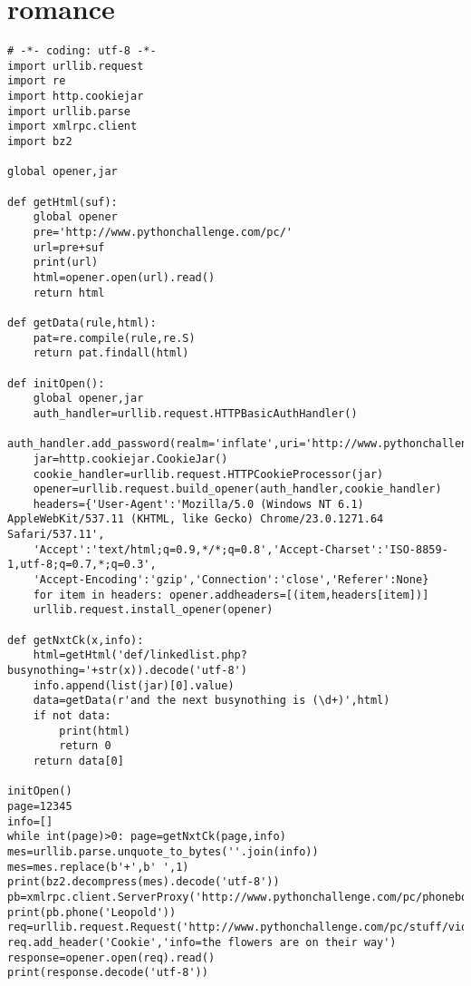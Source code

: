 \documentclass[onecolumn,a4paper,12pt]{article}
\begin{document}
\section{romance}
\begin{lstlisting}
# -*- coding: utf-8 -*-
import urllib.request
import re
import http.cookiejar
import urllib.parse
import xmlrpc.client
import bz2

global opener,jar

def getHtml(suf):
    global opener
    pre='http://www.pythonchallenge.com/pc/'
    url=pre+suf
    print(url)
    html=opener.open(url).read()
    return html

def getData(rule,html):
    pat=re.compile(rule,re.S)
    return pat.findall(html)

def initOpen():
    global opener,jar
    auth_handler=urllib.request.HTTPBasicAuthHandler()
    auth_handler.add_password(realm='inflate',uri='http://www.pythonchallenge.com',user='huge',passwd='file')
    jar=http.cookiejar.CookieJar()
    cookie_handler=urllib.request.HTTPCookieProcessor(jar)
    opener=urllib.request.build_opener(auth_handler,cookie_handler)
    headers={'User-Agent':'Mozilla/5.0 (Windows NT 6.1) AppleWebKit/537.11 (KHTML, like Gecko) Chrome/23.0.1271.64 Safari/537.11',
    'Accept':'text/html;q=0.9,*/*;q=0.8','Accept-Charset':'ISO-8859-1,utf-8;q=0.7,*;q=0.3',
    'Accept-Encoding':'gzip','Connection':'close','Referer':None}
    for item in headers: opener.addheaders=[(item,headers[item])]
    urllib.request.install_opener(opener)

def getNxtCk(x,info):
    html=getHtml('def/linkedlist.php?busynothing='+str(x)).decode('utf-8')
    info.append(list(jar)[0].value)
    data=getData(r'and the next busynothing is (\d+)',html)
    if not data:
        print(html)
        return 0
    return data[0]

initOpen()
page=12345
info=[]
while int(page)>0: page=getNxtCk(page,info)
mes=urllib.parse.unquote_to_bytes(''.join(info))
mes=mes.replace(b'+',b' ',1)
print(bz2.decompress(mes).decode('utf-8'))
pb=xmlrpc.client.ServerProxy('http://www.pythonchallenge.com/pc/phonebook.php')
print(pb.phone('Leopold'))
req=urllib.request.Request('http://www.pythonchallenge.com/pc/stuff/violin.php')
req.add_header('Cookie','info=the flowers are on their way')
response=opener.open(req).read()
print(response.decode('utf-8'))
\end{lstlisting}
\end{document}
